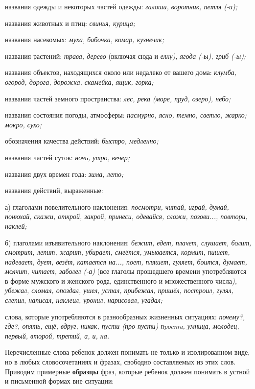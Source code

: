 \documentclass{book}
\renewcommand{\emph}[1]{\textit{#1}}
\begin{document}
названия одежды и некоторых частей одежды: \emph{галоши, воротник, петля
(-и);}

названия животных и птиц: \emph{свинья, курица;}

названия насекомых: \emph{муха, бабочка, комар, кузнечик;}

названия растений: \emph{трава, дерево} (включая сюда и \emph{елку),
ягода (-ы), гриб (-ы);}

названия объектов, находящихся около или недалеко от вашего дома:
\emph{клумба, огород, дорога, дорожка, скамейка, ящик, горка;}

названия частей земного пространства: \emph{лес, река (море, пруд,
озеро), небо;}

названия состояния погоды, атмосферы: \emph{пасмурно, ясно, темно,
светло, жарко; мокро, сухо;}

обозначения качества действий: \emph{быстро, медленно;}

названия частей суток: \emph{ночь, утро, вечер;}

названия двух времен года: \emph{зима, лето;}

названия действий, выраженные:

а) глаголами повелительного наклонения: \emph{посмотри, читай, играй,
думай, понюхай, скажи, открой, закрой, принеси, одевайся, сложи,
позови..., повтори, наклей;}

б) глаголами изъявительного наклонения: \emph{бежит, едет, плачет,
слушает, болит, смотрит, лепит, жарит, убирает, смеётся, умывается,
кормит, пишет, надевает, дует, везёт, катается на..., поет, пляшет,
гуляет, боится, думает, молчит, читает, заболел (-а)} (все глаголы
прошедшего времени употребляются в форме мужского и женского рода,
единственного и множественного числа\emph{), убежал, сломал, опоздал,
ушел, устал, прибежал, пришёл, построил, гулял, слепил, написал,
наклеил, уронил, нарисовал, угадал;}

слова, которые употребляются в разнообразных жизненных ситуациях:
\emph{почему?, где?, опять, ещё, вдруг, никак, пусти (про пусти) пpocmu,
умница, молодец, первый, второй, третий, а, и, на.}

Перечисленные слова ребенок должен понимать не только и изолированном
виде, но в любых словосочетаниях и фразах, свободно составляемых из этих
слов. Приводим примерные \textbf{образцы} фраз, которые ребенок должен
понимать в устной и письменной формах вне ситуации:
\end{document}
